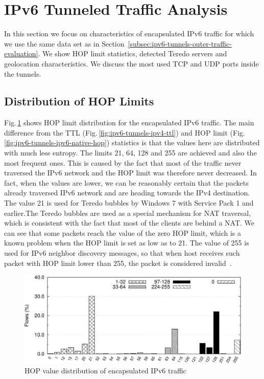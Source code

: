 \section{IPv6 Tunneled Traffic Analysis} \label{subsec:ipv6-tunnels-inner-traffic-evaluation}

In this section we focus on characteristics of encapsulated IPv6 traffic for which we use the same data set as in Section~\ref{subsec:ipv6-tunnels-outer-traffic-evaluation}. We show HOP limit statistics, detected Teredo servers and geolocation characteristics. We discuss the most used TCP and UDP ports inside the tunnels.

\subsection{Distribution of HOP Limits}
Fig.\,\ref{fig:ipv6-tunnels-tunnels-hop} shows HOP limit distribution for the encapsulated IPv6 traffic. The main difference from the TTL (Fig.\,\ref{fig:ipv6-tunnels-ipv4-ttl}) and HOP limit (Fig.\,\ref{fig:ipv6-tunnels-ipv6-native-hop}) statistics is that the values here are distributed with much less entropy. The limits 21, 64, 128 and 255 are achieved and also the most frequent ones. This is caused by the fact that most of the traffic never traversed the IPv6 network and the HOP limit was therefore never decreased. In fact, when the values are lower, we can be reasonably certain that the packets already traversed IPv6 network and are heading towards the IPv4 destination. The value 21 is used for Teredo bubbles by Windows 7 with Service Pack 1 and earlier.The Teredo bubbles are used as a special mechanism for NAT traversal, which is consistent with the fact that most of the clients are behind a NAT. We can see that some packets reach the value of the zero HOP limit, which is a known problem when the HOP limit is set as low as to 21. The value of 255 is used for IPv6 neighbor discovery messages, so that when host receives such packet with HOP limit lower than 255, the packet is considered invalid~\cite{rfc4861}.

\begin{figure}[!tb]
        \centering
        \includegraphics[width=1.00\linewidth]{figures/paper-tunnels/ttl/hop}
        \caption{HOP value distribution of encapsulated IPv6 traffic}
        \label{fig:ipv6-tunnels-tunnels-hop}
\end{figure}

